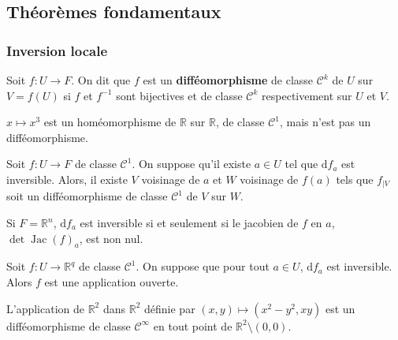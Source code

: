 	\subsection{Théorèmes fondamentaux}

	\subsubsection{Inversion locale}


	\begin{definition}
		\label{key}
		Soit $f : U \rightarrow F$. On dit que $f$ est un \textbf{difféomorphisme} de classe $\mathcal{C}^k$ de $U$ sur $V = f(U)$ si $f$ et $f^{-1}$ sont bijectives et de classe $\mathcal{C}^k$ respectivement sur $U$ et $V$.
	\end{definition}

	\begin{example}
		$x \mapsto x^3$ est un homéomorphisme de $\mathbb{R}$ sur $\mathbb{R}$, de classe $\mathcal{C}^1$, mais n'est pas un difféomorphisme.
	\end{example}


	\begin{theorem}
		Soit $f : U \rightarrow F$ de classe $\mathcal{C}^1$. On suppose qu'il existe $a \in U$ tel que $\mathrm{d}f_a$ est inversible.
		\newpar
		Alors, il existe $V$ voisinage de $a$ et $W$ voisinage de $f(a)$ tels que $f_{|V}$ soit un difféomorphisme de classe $\mathcal{C}^1$ de $V$ sur $W$.
	\end{theorem}

	\begin{remark}
		Si $F = \mathbb{R}^n$, $\mathrm{d}f_a$ est inversible si et seulement si le jacobien de $f$ en $a$, $\det \operatorname{Jac}(f)_a$, est non nul.
	\end{remark}

	\begin{corollary}
		Soit $f : U \rightarrow \mathbb{R}^q$ de classe $\mathcal{C}^1$. On suppose que pour tout $a \in U$, $\mathrm{d}f_a$ est inversible. Alors $f$ est une application ouverte.
	\end{corollary}


	\begin{example}
		\label{214-1}
		L'application de $\mathbb{R}^2$ dans $\mathbb{R}^2$ définie par $(x, y) \mapsto (x^2-y^2, xy)$ est un difféomorphisme de classe $\mathcal{C}^\infty$ en tout point de $\mathbb{R}^2 \setminus (0,0)$.
	\end{example}

